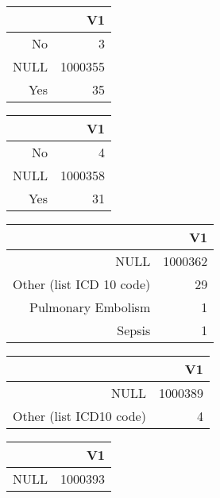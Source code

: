 \bigskip\bigskip
\centering
\begin{tabular}{rr}
  \hline
 & V1 \\ 
  \hline
No &   3 \\ 
  NULL & 1000355 \\ 
  Yes &  35 \\ 
   \hline
\end{tabular}

\bigskip\bigskip
\centering
\begin{tabular}{rr}
  \hline
 & V1 \\ 
  \hline
No &   4 \\ 
  NULL & 1000358 \\ 
  Yes &  31 \\ 
   \hline
\end{tabular}

\bigskip\bigskip
\centering
\begin{tabular}{rr}
  \hline
 & V1 \\ 
  \hline
NULL & 1000362 \\ 
  Other (list ICD 10 code) &  29 \\ 
  Pulmonary Embolism &   1 \\ 
  Sepsis &   1 \\ 
   \hline
\end{tabular}

\bigskip\bigskip
\centering
\begin{tabular}{rr}
  \hline
 & V1 \\ 
  \hline
NULL & 1000389 \\ 
  Other (list ICD10 code) &   4 \\ 
   \hline
\end{tabular}

\bigskip\bigskip
\centering
\begin{tabular}{rr}
  \hline
 & V1 \\ 
  \hline
NULL & 1000393 \\ 
   \hline
\end{tabular}

